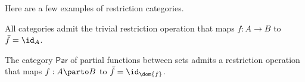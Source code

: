 \begin{examples}
  Here are a few examples of restriction categories.~\cite{CATEGORY-THEORY-TEXT}
  \begin{enumarabic}
    \item All categories admit the trivial restriction operation
      that maps $f : A \to B$ to $\bar{f} = \id_{A}$.
    \item The category $\mathsf{Par}$ of partial functions between sets
      admits a restriction operation that maps
      $f : A \parto B$ to $\bar{f} = \id_{\dom{f}}$.
  \end{enumarabic}
\end{examples}
